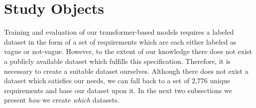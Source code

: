 \section{Study Objects}
\label{chp:study:sec:study_objects}

Training and evaluation of our transformer-based models requires a labeled dataset in the form of a set of requirements which are each either labeled as vague or not-vague.
However, to the extent of our knowledge there does not exist a publicly available dataset which fulfills this specification.
Therefore, it is necessary to create a suitable dataset ourselves.
Although there does not exist a dataset which satisfies our needs, we can fall back to a set of 2,776 unique requirements \parencite{Kummeth:2020} and base our dataset upon it.
In the next two subsections we present \textit{how} we create \textit{which} datasets.



